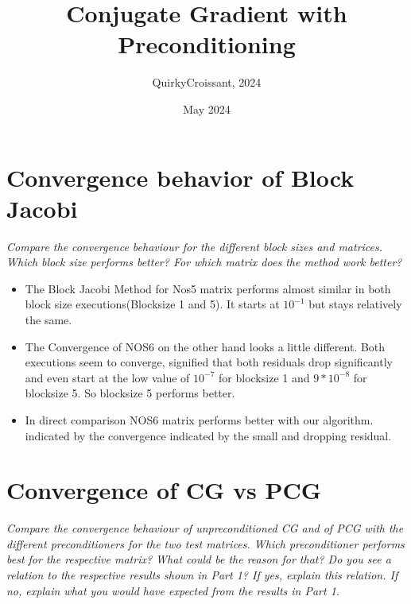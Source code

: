 \documentclass{article}
\title{Conjugate Gradient with Preconditioning}
\author{QuirkyCroissant, 2024}
\date{May 2024}
\begin{document}
\maketitle

\section*{Convergence behavior of Block Jacobi}

\textit{Compare the convergence behaviour for the different block sizes and matrices. Which block size performs better? For which matrix does the method work better? }

\begin{itemize}
    \item The Block Jacobi Method for Nos5 matrix performs almost similar in both block size executions(Blocksize 1 and 5). It starts at $10^{-1}$ but stays relatively the same.
    \item The Convergence of NOS6 on the other hand looks a little different. Both executions seem to converge, signified that both residuals drop significantly and even start at the low value of $10^{-7}$ for blocksize 1 and $9*10^{-8}$ for blocksize 5. So blocksize 5 performs better.
    \item In direct comparison NOS6 matrix performs better with our algorithm. indicated by the convergence indicated by the small and dropping residual.

\end{itemize}
 
    
\section*{Convergence of CG vs PCG}

\textit{Compare the convergence behaviour of unpreconditioned CG and of PCG with the different preconditioners for the two test matrices. Which preconditioner performs best for the respective matrix? What could be the reason for that? Do you see a relation to the respective results shown in Part 1? 
If yes, explain this relation. If no, explain what you would have expected from the results in Part 1.} 
\end{document}
